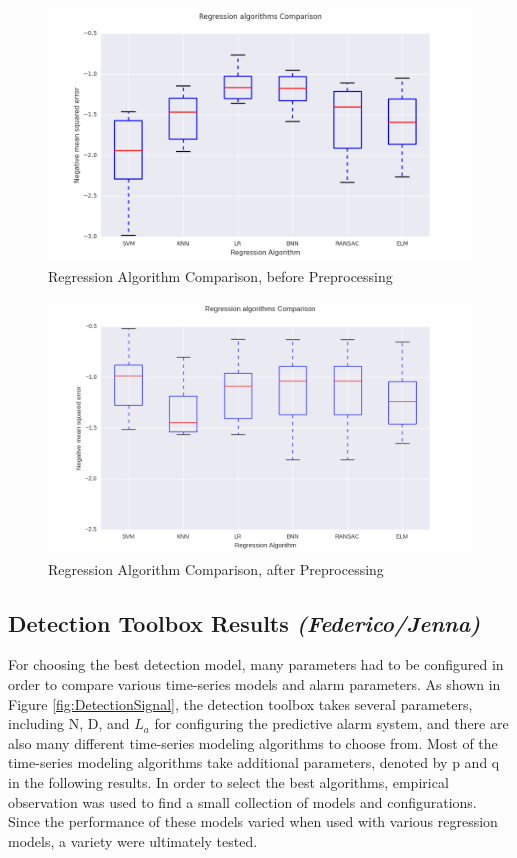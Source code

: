 \documentclass{acm_proc_article-sp}
\begin{document}
\begin{figure}[!h]
\centering
    \includegraphics[scale=0.35]{figures/nopre_comparison.png}
\caption{Regression Algorithm Comparison, before Preprocessing} 
\label{fig:regcomp1}
\end{figure}

\begin{figure}[!h]
\centering
    \includegraphics[scale=0.35]{figures/comparision.png}
\caption{Regression Algorithm Comparison, after Preprocessing} 
\label{fig:regcomp2}
\end{figure}


\subsection{Detection Toolbox Results \textit{(Federico/Jenna)}}
For choosing the best detection model, many parameters had to be configured in order to compare various time-series models and alarm parameters. As shown in Figure \ref{fig:DetectionSignal}, the detection toolbox takes several parameters, including N, D, and \begin{math}L_a\end{math} for configuring the predictive alarm system, and there are also many different time-series modeling algorithms to choose from. Most of the time-series modeling algorithms take additional parameters, denoted by p and q in the following results. In order to select the best algorithms, empirical observation was used to find a small collection of models and configurations. Since the performance of these models varied when used with various regression models, a variety were ultimately tested.
\end{document}

